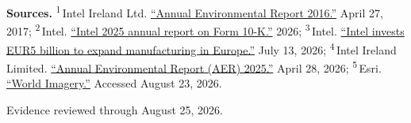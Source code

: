 \begin{minipage}[t][0.90\textheight][t]{\textwidth}
{\sffamily\scriptsize\setlength{\emergencystretch}{1.5em}\textbf{Sources.} \textsuperscript{1}\,Intel Ireland Ltd. \href{\detokenize{https://epawebapp.epa.ie/licences/lic_eDMS/090151b28063c199.pdf}}{\enquote{Annual Environmental Report 2016.}} April 27, 2017; \textsuperscript{2}\,Intel. \href{\detokenize{https://www.intc.com/filings-reports/all-sec-filings/content/0000050863-26-000011/intc-20251227.htm}}{\enquote{Intel 2025 annual report on Form 10-K.}} 2026; \textsuperscript{3}\,Intel. \href{\detokenize{https://web.archive.org/web/20260814012648/https://newsroom.intel.com/intel-foundry/intel-invests-5-billion-euro-to-expand-manufacturing-in-europe}}{\enquote{Intel invests EUR5 billion to expand manufacturing in Europe.}} July 13, 2026; \textsuperscript{4}\,Intel Ireland Limited. \href{\detokenize{https://leap.epa.ie/docs/81d5494a-236b-437f-b142-5afa039042a4.pdf}}{\enquote{Annual Environmental Report (AER) 2025.}} April 28, 2026; \textsuperscript{5}\,Esri. \href{\detokenize{https://www.arcgis.com/home/item.html?id=10df2279f9684e4a9f6a7f08febac2a9}}{\enquote{World Imagery.}} Accessed August 23, 2026.\par}
\vfill
\noindent{\color{hairline}\rule{\linewidth}{0.4pt}}\par\smallskip
{\sffamily\scriptsize\color{black!58} Evidence reviewed through August 25, 2026.\par}
\end{minipage}
\clearpage
